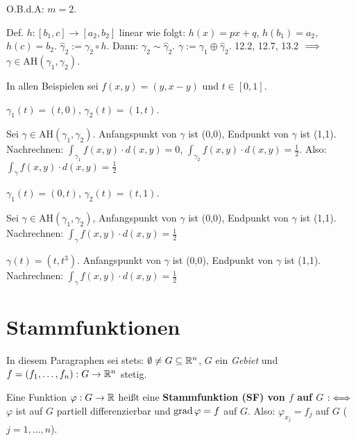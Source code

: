 \documentclass[a4paper,twoside,DIV15,BCOR12mm,chapterprefix=true,headings=twolinechapter]{scrbook}
\begin{document}
\begin{beweis}
O.B.d.A: $m=2$.

Def. $h:[b_1,c] \to [a_2,b_2]$ linear wie folgt: $h(x)=px+q$, $h(b_1)=a_2$, $h(c)=b_2$. $\hat\gamma_2 := \gamma_2\circ h$. Dann: $\gamma_2\sim \hat\gamma_2$. $\gamma := \gamma_1\oplus\hat\gamma_2$. 12.2, 12.7, 13.2 $\implies$ $\gamma\in \text{AH}(\gamma_1,\gamma_2)$.
\end{beweis}

\begin{beispiel}
In allen Beispielen sei $f(x,y)=(y,x-y)$ und $t\in[0,1]$.
\begin{liste}
\item $\gamma_1(t)=(t,0)$, $\gamma_2(t)=(1,t)$.

Sei $\gamma \in \text{AH}(\gamma_1,\gamma_2)$. Anfangspunkt von $\gamma$ ist (0,0), Endpunkt von $\gamma$ ist (1,1). Nachrechnen: $\int_{\gamma_1}f(x,y)\cdot d(x,y) = 0$, $\int_{\gamma_2}f(x,y)\cdot d(x,y) = \frac{1}{2}$. Also: $\int_\gamma f(x,y) \cdot d(x,y) = \frac{1}{2}$

\item $\gamma_1(t) = (0,t)$, $\gamma_2(t)=(t,1)$.

Sei $\gamma\in \text{AH}(\gamma_1,\gamma_2)$, Anfangspunkt von $\gamma$ ist (0,0), Endpunkt von $\gamma$ ist (1,1). Nachrechnen: $\int_{\gamma}f(x,y)\cdot d(x,y) = \frac{1}{2}$

\item $\gamma(t)=(t,t^3)$. Anfangspunkt von $\gamma$ ist (0,0), Endpunkt von $\gamma$ ist (1,1). Nachrechnen: $\int_\gamma f(x,y)\cdot d(x,y) = \frac{1}{2}$
\end{liste}
\end{beispiel}

\chapter{Stammfunktionen}

In diesem Paragraphen sei stets: $\emptyset \ne G \subseteq \mathbb{R}^n$, $G$ ein \emph{Gebiet} und $f=(f_1,\ldots,f_n): G\to\mathbb{R}^n$ stetig.

\begin{definition}
Eine Funktion $\varphi:G\to\mathbb{R}$ heißt eine \textbf{Stammfunktion (SF) von $f$ auf $G$} $:\iff$ $\varphi$ ist auf $G$ partiell differenzierbar und $\mathop{\rm grad}\nolimits\varphi = f$ auf $G$. Also: $\varphi_{x_j} = f_j$ auf $G$ ($j=1,\ldots,n$).
\end{definition}
\end{document}
